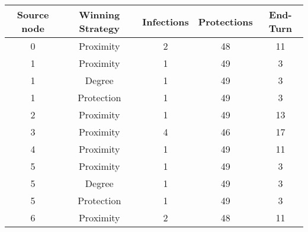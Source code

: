 \documentclass[results.tex]{subfiles}
\begin{document}
    \begin{center}
        \begin{tabular}{| c || c | c | c | c |}
            \hline
            {\bfseries Source node} & {\bfseries Winning Strategy} & {\bfseries Infections} & {\bfseries Protections}
            & {\bfseries End-Turn}
            \\  %
            \hline\hline
            0                       & Proximity                    & 2                      & 48                      & 11                   \\
            \hline
            1                       & Proximity                    & 1                      & 49                      & 3                    \\
            \hline
            1                       & Degree                       & 1                      & 49                      & 3                    \\
            \hline
            1                       & Protection                   & 1                      & 49                      & 3                    \\
            \hline
            2                       & Proximity                    & 1                      & 49                      & 13                   \\
            \hline
            3                       & Proximity                    & 4                      & 46                      & 17                   \\
            \hline
            4                       & Proximity                    & 1                      & 49                      & 11                   \\
            \hline
            5                       & Proximity                    & 1                      & 49                      & 3                    \\
            \hline
            5                       & Degree                       & 1                      & 49                      & 3                    \\
            \hline
            5                       & Protection                   & 1                      & 49                      & 3                    \\
            \hline
            6                       & Proximity                    & 2                      & 48                      & 11                   \\

\end{tabular}
\end{center}
\end{document}
